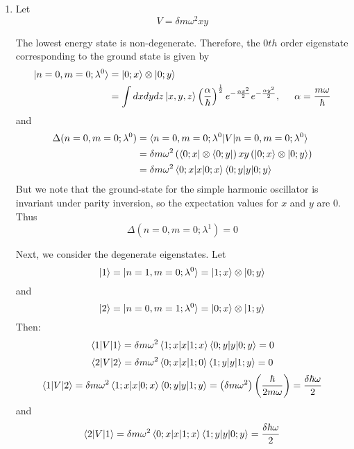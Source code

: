 \documentclass[12pt, letterpaper]{article}
\begin{document}
\begin{enumerate}
\begin{enumerate}
\item 
Let 
\begin{equation}
        V=\delta m \omega^2 xy
\end{equation}

The lowest energy state is non-degenerate. Therefore, the $0th$ order eigenstate corresponding to the ground state is given by
\begin{align}
        \ket{n=0,m=0;\lambda^0}&=\ket{0;x}\otimes \ket{0;y}\\&=\int dx dy dz \ket{x,y,z}\left(\frac{\alpha}{\hbar}\right)^{\frac{1}{2}}e^{-\frac{\alpha x^2}{2}}e^{-\frac{\alpha y^2}{2}},\hspace{0.5cm}\alpha=\frac{m\omega}{\hbar}
\end{align}
and 
\begin{align}
        \Delta(n=0,m=0;\lambda^0)&=\braket{n=0,m=0;\lambda^0|V|n=0,m=0;\lambda^0}\\&=\delta m \omega^2 \left(\bra{0;x}\otimes \bra{0;y}\right)xy\left(\ket{0;x}\otimes \ket{0;y}\right)\\&=\delta m \omega^2 \braket{0;x|x|0;x}\braket{0;y|y|0;y}
\end{align}
But we note that the ground-state for the simple harmonic oscillator is invariant under parity inversion, so the expectation values for $x$ and $y$ are $0$. Thus
\begin{equation}
        \Delta(n=0,m=0;\lambda^1)=0
\end{equation}

Next, we consider the degenerate eigenstates. Let
\begin{equation}
        \ket{1}=\ket{n=1,m=0;\lambda^0}=\ket{1;x}\otimes\ket{0;y} 
\end{equation}
and 
\begin{equation}
        \ket{2}=\ket{n=0,m=1;\lambda^0}=\ket{0;x}\otimes\ket{1;y} 
\end{equation}
Then:
\begin{equation}
        \braket{1|V|1}=\delta m\omega^2 \braket{1;x|x|1;x}\braket{0;y|y|0;y}=0
\end{equation}
\begin{equation}
        \braket{2|V|2}=\delta m\omega^2 \braket{0;x|x|1;0}\braket{1;y|y|1;y}=0
\end{equation}
\begin{equation}
        \braket{1|V|2}=\delta m\omega^2 \braket{1;x|x|0;x}\braket{0;y|y|1;y}=\left(\delta m \omega^2\right)\left( \frac{\hbar }{2m\omega}\right)=\frac{\delta \hbar \omega}{2} 
\end{equation}
and 
\begin{equation}
        \braket{2|V|1}=\delta m\omega^2 \braket{0;x|x|1;x}\braket{1;y|y|0;y}=\frac{\delta \hbar \omega}{2}
\end{equation}


\end{enumerate}
\end{enumerate}
\end{document}
